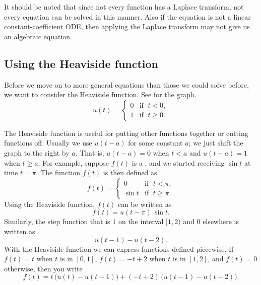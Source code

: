 It should be noted that since not every function has a Laplace transform,
not every equation can be solved in this manner.  Also if the equation
is not a linear constant-coefficient ODE\@,
then applying the Laplace transform may not
give us an algebraic equation.

\subsection{Using the Heaviside function}

Before we move on to more general equations
than those we could solve before,
we want to consider the Heaviside function.  See 
for the graph.
\begin{equation*}
u(t) =
\begin{cases}
0 & \text{if } \; t < 0 , \\ 
1 & \text{if } \; t \geq 0 .
\end{cases}
\end{equation*}

\begin{myfig}
\capstart
{}
\caption{Plot of the Heaviside (unit step) function
$u(t)$.\label{lt:heavisidefig}}
\end{myfig}

The Heaviside function is useful for
putting other functions together or cutting functions off.  Usually we use
$u(t-a)$ for some constant $a$;  we just shift the graph to the
right by $a$.  That is, $u(t-a) = 0$ when $t < a$ and $u(t-a) = 1$
when $t \geq a$.  For example, suppose $f(t)$ is a ,
and we started receiving $\sin t$ at time $t=\pi$.
The function $f(t)$ is then defined as
\begin{equation*}
f(t) =
\begin{cases}
0 & \text{if } \; t < \pi , \\ 
\sin t & \text{if } \; t \geq \pi .
\end{cases}
\end{equation*}
Using the Heaviside function, $f(t)$ can
be written as
\begin{equation*}
f(t) = u(t - \pi) \, \sin t .
\end{equation*}
Similarly, the step function that is $1$ on the interval $[1,2)$ and $0$
elsewhere is written as
\begin{equation*}
u(t - 1) - u(t-2) .
\end{equation*}
With the Heaviside function we can express functions defined piecewise.
If $f(t) = t$ when $t$ is in $[0,1]$,
$f(t) = -t+2$
when $t$ is in $[1,2]$, and $f(t) = 0$ otherwise, then you write
\begin{equation*}
f(t) = t \, \bigl( u(t) - u(t-1) \bigr) + 
(-t+2) \, \bigl( u(t - 1) - u(t-2) \bigr) .
\end{equation*}

